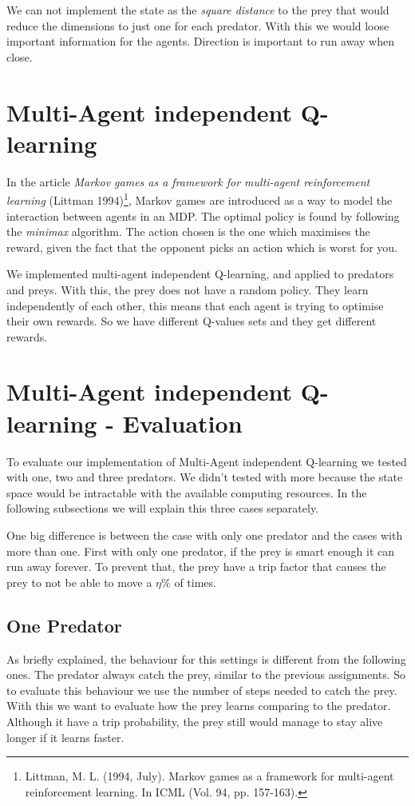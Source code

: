 \documentclass{article}
\begin{document}
We can not implement the state as the \emph{square distance} to the prey that
would reduce the dimensions to just one for each predator. With this we would
loose important information for the agents. Direction is important to run away
when close.

\section{Multi-Agent independent Q-learning}
In the article \emph{Markov games as a framework for multi-agent reinforcement learning} (Littman 1994)\footnote{Littman, M. L. (1994, July). Markov games as a framework for multi-agent reinforcement learning. In ICML (Vol. 94, pp. 157-163).}, Markov games are introduced as a way to model the interaction between agents in an MDP. The optimal policy is found by following the \emph{minimax} algorithm. The action chosen is the one which maximises the reward, given the fact that the opponent picks an action which is worst for you.

We implemented multi-agent independent Q-learning, and applied to predators and
preys. With this, the prey does not have a random policy. They learn
independently of each other, this means that each agent is trying to optimise
their own rewards. So we have different Q-values sets and they get different
rewards.

\section{Multi-Agent independent Q-learning - Evaluation}
To evaluate our implementation of Multi-Agent independent Q-learning we tested
with one, two and three predators. We didn't tested with more because the state
space would be intractable with the available computing resources. In the
following subsections we will explain this three cases separately.

One big difference is between the case with only one predator and the cases with
more than one. First with only one predator, if the prey is smart enough it can
run away forever. To prevent that, the prey have a trip factor that causes the
prey to not be able to move a $\eta\%$ of times.

\subsection{One Predator}
As briefly explained, the behaviour for this settings is different from the
following ones. The predator always catch the prey, similar to the previous
assignments. So to evaluate this behaviour we use the number of steps needed to
catch the prey. With this we want to evaluate how the prey learns comparing to
the predator. Although it have a trip probability, the prey still would manage to
stay alive longer if it learns faster.
\end{document}
